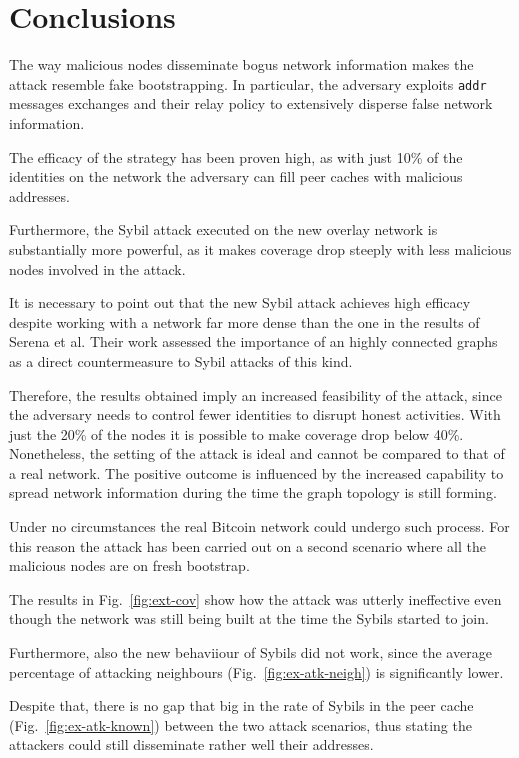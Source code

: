 \chapter{Conclusions}
\label{sec:concl}

The way malicious nodes disseminate bogus network information makes the attack resemble fake bootstrapping. In particular, the adversary exploits \texttt{addr} messages exchanges and their relay policy to extensively disperse false network information. 

The efficacy of the strategy has been proven high, as with just 10\% of the identities on the network the adversary can fill peer caches with malicious addresses.

Furthermore, the Sybil attack executed on the new overlay network is substantially more powerful, as it makes coverage drop steeply with less malicious nodes involved in the attack.

It is necessary to point out that the new Sybil attack achieves high efficacy despite working with a network far more dense than the one in the results of Serena et al. Their work assessed the importance of an highly connected graphs as a direct countermeasure to Sybil attacks of this kind.

Therefore, the results obtained imply an increased feasibility of the attack, since the adversary needs to control fewer identities to disrupt honest activities. With just the 20\% of the nodes it is possible to make coverage drop below 40\%.\\

Nonetheless, the setting of the attack is ideal and cannot be compared to that of a real network. The positive outcome is influenced by the increased capability to spread network information during the time the graph topology is still forming.

Under no circumstances the real Bitcoin network could undergo such process. For this reason the attack has been carried out on a second scenario where all the malicious nodes are on fresh bootstrap.

The results in Fig.~\ref{fig:ext-cov} show how the attack was utterly ineffective even though the network was still being built at the time the Sybils started to join.
 
Furthermore, also the new behaviiour of Sybils did not work, since the average percentage of attacking neighbours (Fig.~\ref{fig:ex-atk-neigh}) is significantly lower.

Despite that, there is no gap that big in the rate of Sybils in the peer cache (Fig.~\ref{fig:ex-atk-known}) between the two attack scenarios, thus stating the attackers could still disseminate rather well their addresses.

